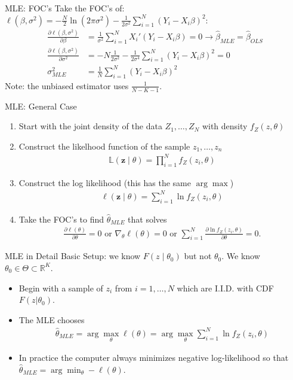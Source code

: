 \documentclass[aspectratio=169,11pt]{beamer}
\begin{document}
\begin{frame}{MLE: FOC's}
Take the FOC's of: 
$\ell(\beta,\sigma^2) = -\frac{N}{2} \ln (2 \pi \sigma^2) - \frac{1}{2 \sigma^2} \sum_{i=1}^N(Y_i - X_i \beta)^2
$:
\begin{align*} 
\frac{ \partial \ell(\beta,\sigma^2) }{\partial \beta}&= \frac{1}{ \sigma^2}\sum_{i=1}^N X_i'(Y_i - X_i \beta) = 0 \rightarrow \widehat{\beta}_{MLE}= \widehat{\beta}_{OLS}\\ 
\frac{ \partial \ell(\beta,\sigma^2) }{\partial \sigma^2}&= -N \frac{1}{2 \sigma^2}  -  \frac{1}{2 \sigma^4} \sum_{i=1}^N(Y_i - X_i \beta)^2 = 0 \\
\sigma^2_{MLE} &= \frac{1}{N} \sum_{i=1}^N (Y_i - X_i \beta)^2
\end{align*}
Note: the unbiased estimator uses $\frac{1}{N-K-1}$.
\end{frame}

\begin{frame}{MLE: General Case}
\begin{enumerate}
\item Start with the \alert{joint density of the data} $Z_1,\ldots,Z_N$ with density $f_Z(z,\theta)$
\item Construct the likelhood function of the sample $z_1,\ldots,z_n$
\begin{align*}
\mathbb{L}(\mathbf{z} \mid  \theta) = \prod_{i=1}^N f_Z(z_i,\theta)
\end{align*}
\item Construct the \alert{log likelihood} (this has the same $\arg \max$)
\begin{align*}
\ell(\mathbf{z} \mid \theta) = \sum_{i=1}^N \ln f_Z(z_i,\theta)
\end{align*}
\item Take the FOC's to find $\widehat{\theta}_{MLE}$ that solves
\begin{align*}
\frac{\partial \ell(\theta)}{\partial \theta} =0 \text{ or  } \nabla_{\theta} \ell(\theta) =0 \text{ or  } \sum_{i=1}^N \frac{\partial \ln f_Z(z_i,\theta) }{\partial \theta}  =0.
\end{align*}
\end{enumerate}
\end{frame}

\begin{frame}{MLE in Detail}
Basic Setup: we know $F(z \mid \theta_0)$ but not $\theta_0$. We know $\theta_0 \in \Theta \subset \mathbb{R}^K$.
\begin{itemize}
\item Begin with a sample of $z_i$ from $i=1,\ldots,N$ which are I.I.D. with CDF $F(z|\theta_0)$.
\item The MLE chooses
\begin{align*}
\widehat{\theta}_{MLE} = \arg \max_{\theta} \ell(\theta) = \arg \max_{\theta} \sum_{i=1}^N \ln f_Z(z_i,\theta)
\end{align*}
\item In practice the computer always \alert{minimizes negative log-likelihood} so that $\widehat{\theta}_{MLE} = \arg \min_{\theta} - \ell(\theta)$.
\end{itemize}
\end{frame}
\end{document}
